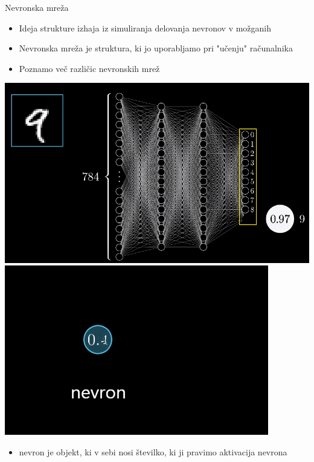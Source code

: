 \documentclass{beamer}
\begin{document}
\begin{frame}{Nevronska mreža}
\begin{itemize}
 \item
  Ideja strukture izhaja iz simuliranja delovanja nevronov v možganih
 \item
  Nevronska mreža je struktura, ki jo uporabljamo pri "učenju" računalnika
 \item
  Poznamo več različic nevronskih mrež
\end{itemize}
\begin{center}
\includegraphics[scale = 0.3]{photo/foto3}
\includegraphics[scale = 0.3]{photo/nevron}
\end{center}
\begin{itemize}
\item
nevron je objekt, ki v sebi nosi številko, ki ji pravimo aktivacija nevrona
\end{itemize}
\end{frame}
\end{document}
